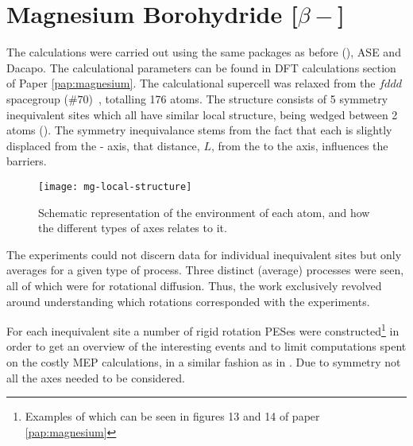 \section{Magnesium Borohydride [$\beta-$]}
\label{sec:borohydrides-magnesium}

The calculations were carried out using the same packages as before (), ASE and Dacapo.
The calculational parameters can be found in DFT calculations section of Paper \ref{pap:magnesium}.
The calculational supercell was relaxed from the $fddd$ spacegroup ($\#70$)~\cite{mgbh42-structure-fddd}, totalling 176 atoms.
The structure consists of 5 symmetry inequivalent  sites which all have similar local structure, being wedged between 2  atoms ().
The symmetry inequivalance stems from the fact that each  is slightly displaced from the - axis, that distance, $L$, from the  to the axis, influences the barriers.

\begin{figure}[htb]
\begin{minipage}{1.0\textwidth}
\begin{center}
    \texttt{[image: mg-local-structure]}
    \parbox{0.85\linewidth}{
\caption{%
Schematic representation of the environment of each  atom, and how the different types of axes relates to it.
}
\label{fig:mg-local-structure}
}
\end{center}
\end{minipage}
\end{figure}

The experiments could not discern data for individual inequivalent sites but only averages for a given type of process.
Three distinct (average) processes were seen, all of which were for rotational diffusion.
Thus, the work exclusively revolved around understanding which rotations corresponded with the experiments.

For each inequivalent site a number of rigid rotation PESes were constructed\footnote{Examples of which can be seen in figures 13 and 14 of paper \ref{pap:magnesium}} in order to get an overview of the interesting events and to limit computations spent on the costly MEP calculations, in a similar fashion as in .
Due to symmetry not all the axes needed to be considered.

